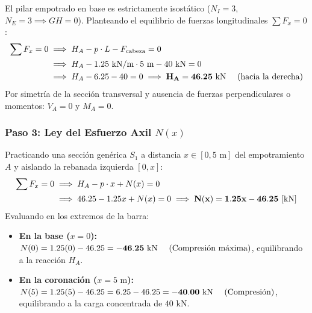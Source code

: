 El pilar empotrado en base es estrictamente isostático ($N_I = 3$, $N_E = 3 \implies GH = 0$). Planteando el equilibrio de fuerzas longitudinales $\sum F_x = 0$:
\begin{align}
    \sum F_x = 0 & \implies H_A - p \cdot L - F_{\text{cabeza}} = 0 \notag \\
                 & \implies H_A - 1.25\text{ kN/m} \cdot 5\text{ m} - 40\text{ kN} = 0 \notag \\
                 & \implies H_A - 6.25 - 40 = 0 \implies \mathbf{H_A = 46.25\text{ kN \quad (hacia la derecha)}}
\end{align}
Por simetría de la sección transversal y ausencia de fuerzas perpendiculares o momentos: $V_A = 0$ y $M_A = 0$.

\subsubsection*{Paso 3: Ley del Esfuerzo Axil $N(x)$}

Practicando una sección genérica $S_1$ a distancia $x \in [0, 5\text{ m}]$ del empotramiento $A$ y aislando la rebanada izquierda $[0, x]$:
\begin{align}
    \sum F_x = 0 & \implies H_A - p \cdot x + N(x) = 0 \notag \\
                 & \implies 46.25 - 1.25 x + N(x) = 0 \implies \mathbf{N(x) = 1.25 x - 46.25\text{ [kN]}}
\end{align}
Evaluando en los extremos de la barra:
\begin{itemize}
    \item \textbf{En la base ($x = 0$):} $N(0) = 1.25(0) - 46.25 = \mathbf{-46.25\text{ kN \quad (Compresión máxima)}}$, equilibrando a la reacción $H_A$.
    \item \textbf{En la coronación ($x = 5\text{ m}$):} $N(5) = 1.25(5) - 46.25 = 6.25 - 46.25 = \mathbf{-40.00\text{ kN \quad (Compresión)}}$, equilibrando a la carga concentrada de $40\text{ kN}$.
\end{itemize}

